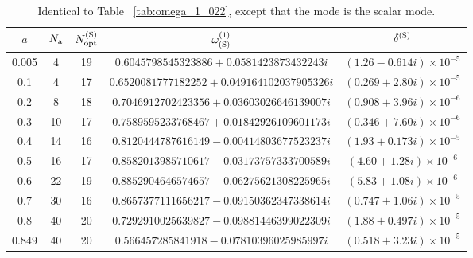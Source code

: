 \documentclass[aps,prx,amsmath,floats,floatfix,twocolumn,
  superscriptaddress,nofootinbib,showpacs]{revtex4-1}
\begin{document}
\begin{table}[htb]
\begin{tabular}{c|c|c|c|c}
\hline
$a$ & $N_{\rm a}$ & $N^{\rm (S)}_{\rm opt}$  & $\omega^{(1)}_{\rm (S)}$ & $\delta^{\rm (S)}$ \\ \hline
0.005 & 4 & 19 & $0.6045798545323886 + 0.0581423873432243i$ & $(1.26-0.614i) \times 10^{-5}$  \\
0.1 & 4 & 17 & $0.6520081777182252 + 0.049164102037905326i$ & $(0.269+2.80i) \times 10^{-5}$ \\
0.2 & 8 & 18 & $0.7046912702423356 + 0.03603026646139007i$ & $(0.908+3.96i) \times 10^{-6}$ \\
0.3 & 10 & 17 & $0.7589595233768467 + 0.01842926109601173i$ & $(0.346+7.60i) \times 10^{-6}$ \\
0.4 & 14 & 16 & $0.8120444787616149 - 0.00414803677523237i$ & $(1.93+0.173i) \times 10^{-5}$ \\
0.5 & 16 & 17 & $0.8582013985710617 - 0.03173757333700589i$ & $(4.60+1.28i) \times 10^{-6}$ \\
0.6 & 22 & 19 & $0.8852904646574657 - 0.06275621308225965i$ & $(5.83+1.08i) \times 10^{-6}$ \\
0.7 & 30 & 16 & $0.8657377111656217 - 0.09150362347338614i$ & $ (0.747+1.06i) \times 10^{-5}$ \\
0.8 & 40 & 20 & $0.7292910025639827 - 0.09881446399022309i$ & $ (1.88+0.497i) \times 10^{-5}$ \\ 
0.849 & 40 & 20 & $0.566457285841918 - 0.07810396025985997i$ & $ (0.518+3.23i) \times 10^{-5}$ \\ \hline
\end{tabular}
\caption{
\label{tab:omega_1_022_scalar} 
Identical to Table ~\ref{tab:omega_1_022}, except that the mode is the scalar mode. 
}
\end{table}
\end{document}

